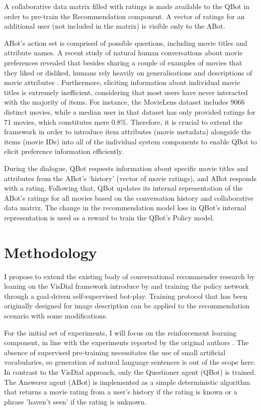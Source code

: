 A collaborative data matrix filled with ratings is made available to the QBot in order to pre-train the Recommendation component. A vector of ratings for an additional user (not included in the matrix) is visible only to the ABot. 

ABot’s action set is comprised of possible questions, including movie titles and attribute names. A recent study of natural human conversations about movie preferences revealed that besides sharing a couple of examples of movies that they liked or disliked, humans rely heavily on generalisations and descriptions of movie attributes \citep{radlinski2019coached}. Furthermore, eliciting information about individual movie titles is extremely inefficient, considering that most users have never interacted with the majority of items. For instance, the MovieLens dataset \citep{harper2015movielens} includes 9066 distinct movies, while a median user in that dataset has only provided ratings for 71 movies, which constitutes mere 0.8\%. Therefore, it is crucial to extend the framework in order to introduce item attributes (movie metadata) alongside the items (movie IDs) into all of the individual system components to enable QBot to elicit preference information efficiently.

During the dialogue, QBot requests information about specific movie titles and attributes from the ABot's ‘history’ (vector of movie ratings), and ABot responds with a rating. Following that, QBot updates its internal representation of the ABot’s ratings for all movies based on the conversation history and collaborative data matrix. The change in the recommendation model loss in QBot's internal representation is used as a reward to train the QBot's Policy model.


\section{Methodology}

I propose to extend the existing body of conversational recommender research by leaning on the VisDial framework introduce by \cite{das2017learning} and training the policy network through a goal-driven self-supervised bot-play. Training protocol that has been originally designed for image description can be applied to the recommendation scenario with some modifications. 

For the initial set of experiments, I will focus on the reinforcement learning component, in line with the experiments reported by the original authors \cite{kottur2017natural}. The absence of supervised pre-training necessitates the use of small artificial vocabularies, so generation of natural language sentences is out of the scope here. In contrast to the VisDial approach, only the Questioner agent (QBot) is trained. The Answerer agent (ABot) is implemented as a simple deterministic algorithm that returns a movie rating from a user's history if the rating is known or a phrase 'haven't seen' if the rating is unknown.

